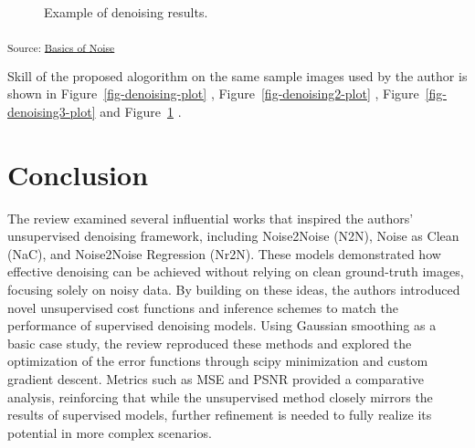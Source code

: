 \documentclass[
]{agujournal2019}
\begin{document}
\begin{figure}[H]


\caption{\label{fig-denoising4-plot}Example of denoising results.}

\end{figure}%

\textsubscript{Source:
\href{https://sijuswamy.github.io/Denoising-Manuscript/notebooks/review-preview.html\#cell-fig-denoising4-plot}{Basics
of Noise}}

Skill of the proposed alogorithm on the same sample images used by the
author is shown in Figure~\ref{fig-denoising-plot} ,
Figure~\ref{fig-denoising2-plot} , Figure~\ref{fig-denoising3-plot} and
Figure~\ref{fig-denoising4-plot} .

\section{Conclusion}\label{conclusion}

The review examined several influential works that inspired the authors'
unsupervised denoising framework, including Noise2Noise (N2N), Noise as
Clean (NaC), and Noise2Noise Regression (Nr2N). These models
demonstrated how effective denoising can be achieved without relying on
clean ground-truth images, focusing solely on noisy data. By building on
these ideas, the authors introduced novel unsupervised cost functions
and inference schemes to match the performance of supervised denoising
models. Using Gaussian smoothing as a basic case study, the review
reproduced these methods and explored the optimization of the error
functions through scipy minimization and custom gradient descent.
Metrics such as MSE and PSNR provided a comparative analysis,
reinforcing that while the unsupervised method closely mirrors the
results of supervised models, further refinement is needed to fully
realize its potential in more complex scenarios.
\end{document}
